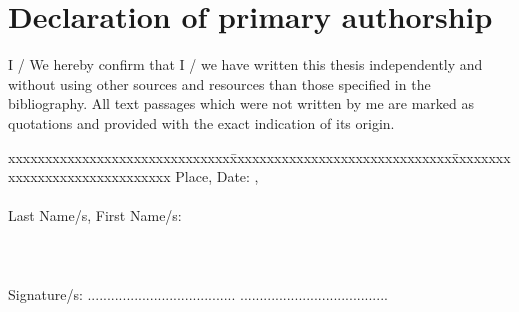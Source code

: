 \chapter*{Declaration of primary authorship}
\label{chap:declaration_authorship}

\vspace*{10mm} 

I / We hereby confirm that I / we have written this thesis independently and without using other sources and resources than those specified in the bibliography. All text passages which were not written by me are marked as quotations and provided with the exact indication of its origin. 

\vspace{15mm}

\begin{tabbing}
xxxxxxxxxxxxxxxxxxxxxxxxxxxxxx\=xxxxxxxxxxxxxxxxxxxxxxxxxxxxxx\=xxxxxxxxxxxxxxxxxxxxxxxxxxxxxx\kill
Place, Date:		, \versiondate \\ \\ 
Last Name/s, First Name/s:	 	\> [M\"uster R\"os\"a] \\ \\ \\ \\ 
Signature/s:	\> ......................................\> ...................................... \\
\end{tabbing}
